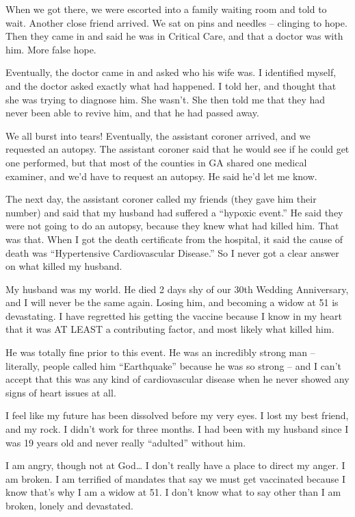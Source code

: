 {When we got there, we were escorted into a family waiting room and told to wait. Another close friend arrived. We sat on pins and needles – clinging to hope. Then they came in and said he was in Critical Care, and that a doctor was with him. More false hope.

Eventually, the doctor came in and asked who his wife was. I identified myself, and the doctor asked exactly what had happened. I told her, and thought that she was trying to diagnose him. She wasn’t. She then told me that they had never been able to revive him, and that he had passed away.

We all burst into tears! Eventually, the assistant coroner arrived, and we requested an autopsy. The assistant coroner said that he would see if he could get one performed, but that most of the counties in GA shared one medical examiner, and we’d have to request an autopsy. He said he’d let me know.

The next day, the assistant coroner called my friends (they gave him their number) and said that my husband had suffered a “hypoxic event.” He said they were not going to do an autopsy, because they knew what had killed him. That was that. When I got the death certificate from the hospital, it said the cause of death was “Hypertensive Cardiovascular Disease.” So I never got a clear answer on what killed my husband.

My husband was my world. He died 2 days shy of our 30th Wedding Anniversary, and I will never be the same again. Losing him, and becoming a widow at 51 is devastating. I have regretted his getting the vaccine because I know in my heart that it was AT LEAST a contributing factor, and most likely what killed him.

He was totally fine prior to this event. He was an incredibly strong man – literally, people called him “Earthquake” because he was so strong – and I can’t accept that this was any kind of cardiovascular disease when he never showed any signs of heart issues at all.

I feel like my future has been dissolved before my very eyes. I lost my best friend, and my rock. I didn’t work for three months. I had been with my husband since I was 19 years old and never really “adulted” without him.

I am angry, though not at God… I don’t really have a place to direct my anger. I am broken. I am terrified of mandates that say we must get vaccinated because I know that’s why I am a widow at 51. I don’t know what to say other than I am broken, lonely and devastated.
}
